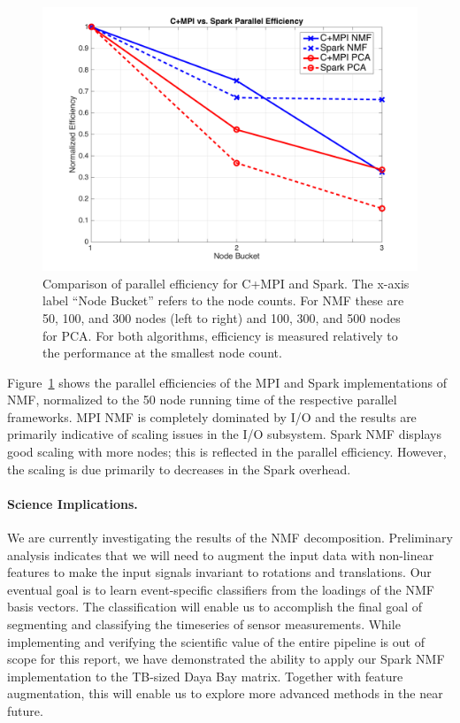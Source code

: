 \begin{figure}[h]
\centering
\includegraphics[width=.9\textwidth]{fig/peff.png}
\caption{Comparison of parallel efficiency for C+MPI and Spark. The x-axis label ``Node Bucket'' refers to the node counts. For NMF these are 50, 100, and 300 nodes (left to right) and 100, 300, and 500 nodes for PCA. For both algorithms, efficiency is measured relatively to the performance at the smallest node count.}
\label{fig:peff}
\end{figure}

Figure~\ref{fig:peff} shows the parallel efficiencies of the MPI and Spark implementations of NMF, normalized to the 50 node running time of the respective parallel frameworks. MPI NMF is completely dominated by I/O and the results are primarily indicative of scaling issues in the I/O subsystem. Spark NMF displays good scaling with more nodes; this is reflected in the parallel efficiency. However, the scaling is due primarily to decreases in the Spark overhead.

\paragraph{Science Implications.}
We are currently investigating the results of the NMF decomposition. Preliminary analysis indicates that we will need to augment the input data with non-linear features to make the input signals invariant to rotations and translations. Our eventual goal is to learn event-specific classifiers from the loadings of the NMF basis vectors. The classification will enable us to accomplish the final goal of segmenting and classifying the timeseries of sensor measurements. While implementing and verifying the scientific value of the entire pipeline is out of scope for this report, we have demonstrated the ability to apply our Spark NMF implementation to the TB-sized Daya Bay matrix. Together with feature augmentation, this will enable us to explore more advanced methods in the near future.

